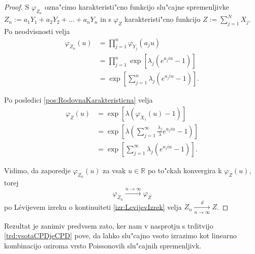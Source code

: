 \documentclass[12pt, a4paper, reqno]{amsart}
\theoremstyle{definition}
\theoremstyle{plain}
\newcommand{\R}{\mathbb{R}}
\newcommand{\1}{\mathds{1}}
\newcommand*{\refPriloga}[1]{%
  \begingroup
    \hypersetup{
      linkcolor=red,
      linkbordercolor=red,
    }%
    \ref{#1}%
  \endgroup
}
\begin{document}
    \begin{proof}
        S $\varphi_{Z_n}$ ozna"cimo karakteristi"cno funkcijo slu"cajne spremenljivke 
        $Z_n := a_1Y_1 + a_2Y_2 + \dots + a_nY_n$ in s $\varphi_{Z}$ karakteristi"cno funkcijo
        $Z:= \sum_{j=1}^{N}X_j$. Po neodvisnosti velja
        \begin{align*}
            \varphi_{Z_n}(u) 
                    &= \prod_{j=1}^{n}\varphi_{Y_j}(a_ju)\\
                    &= \prod_{j=1}^{n}\exp\left[\lambda_j\left(e^{a_j i u} - 1\right)\right] \\
                    &= \exp\left[\sum_{j=1}^{n}\lambda_j\left(e^{a_j i u} - 1\right)\right].
        \end{align*}

        \noindent
        Po posledici  \ref{pos:RodovnaKarakteristicna} velja
        \begin{align*}
            \varphi_{Z}(u) 
                    &= \exp\left[\lambda\left(\varphi_{X_1}(u) - 1\right)\right] \\
                    & = \exp\left[\lambda\left(\sum_{j=1}^\infty\frac{\lambda_j}{\lambda}e^{a_jiu} - 1\right)\right]\\
                    &= \exp\left[\sum_{j=1}^{\infty}\lambda_j\left(e^{a_j i u} - 1\right)\right].
        \end{align*}

        \noindent 
        Vidimo, da zaporedje $\varphi_{Z_n}(u)$ za vsak $u\in\R$ po to"ckah konvergira k $\varphi_{Z}(u)$, torej
        \begin{equation*}
            \varphi_{Z_n} \xrightarrow{n\to\infty}\varphi_Z
        \end{equation*}
        po Lévijevem izreku o kontinuiteti \refPriloga{izr:LevijevIzrek} velja $Z_n \xrightarrow[n\to\infty]{d}Z$.
    \end{proof}

    Rezultat je zanimiv predvsem zato, ker nam v nasprotju s trditvijo \ref{trd:vsotaCPDjeCPD} pove, da 
    lahko slu"cajno vsoto izrazimo kot linearno kombinacijo oziroma vrsto Poissonovih slu"cajnih spremenljivk.
\end{document}
